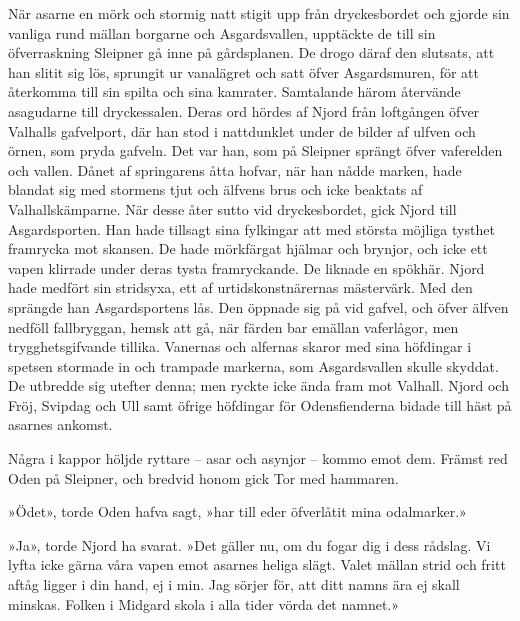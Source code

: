 När asarne en mörk och stormig natt stigit upp från dryckesbordet och
gjorde sin vanliga rund mällan borgarne och Asgardsvallen, upptäckte de
till sin öfverraskning
Sleipner\protect\hypertarget{lb1625905.xhtmlux5cux23start150}{}{}\protect\hypertarget{lb1625905.xhtmlux5cux23start150-a}{}{}\protect\hypertarget{lb1625905.xhtmlux5cux23start150-b}{}{}\protect\hypertarget{lb1625905.xhtmlux5cux23start150-c}{}{}\protect\hypertarget{lb1625905.xhtmlux5cux23start150-d}{}{}
gå inne på gårdsplanen. De drogo däraf den slutsats, att han slitit sig
lös, sprungit ur vanalägret och satt öfver Asgardsmuren, för att
återkomma till sin spilta och sina kamrater. Samtalande härom återvände
asagudarne till dryckessalen. Deras ord hördes af Njord från loftgången
öfver Valhalls gafvelport, där han stod i nattdunklet under de bilder af
ulfven och örnen, som pryda gafveln. Det var han, som på Sleipner
sprängt öfver vaferelden och vallen. Dånet af springarens åtta hofvar,
när han nådde marken, hade blandat sig med stormens tjut och älfvens
brus och icke beaktats af Valhallskämparne. När desse åter sutto vid
dryckesbordet, gick Njord till Asgardsporten. Han hade tillsagt sina
fylkingar att med största möjliga tysthet framrycka mot skansen. De hade
mörkfärgat hjälmar och brynjor, och icke ett vapen klirrade under deras
tysta framryckande. De liknade en spökhär. Njord hade medfört sin
stridsyxa, ett af urtidskonstnärernas mästervärk. Med den sprängde han
Asgardsportens lås. Den öppnade sig på vid gafvel, och öfver älfven
nedföll fallbryggan, hemsk att gå, när färden bar emällan vaferlågor,
men trygghetsgifvande tillika. Vanernas och alfernas skaror med sina
höfdingar i spetsen stormade in och trampade markerna, som Asgardsvallen
skulle skyddat. De utbredde sig utefter denna; men ryckte icke ända fram
mot Valhall. Njord och Fröj, Svipdag och Ull samt öfrige höfdingar för
Odensfienderna bidade till häst på asarnes ankomst.

Några i kappor höljde ryttare -- asar och asynjor -- kommo emot dem.
Främst red Oden på Sleipner, och bredvid honom gick Tor med hammaren.

»Ödet», torde Oden hafva sagt, »har till eder öfverlåtit mina
odalmarker.»

»Ja», torde Njord ha svarat. »Det gäller nu, om du fogar dig i dess
rådslag. Vi lyfta icke gärna våra vapen emot asarnes heliga slägt. Valet
mällan strid och fritt aftåg ligger i din hand, ej i min. Jag sörjer
för, att ditt namns ära ej skall minskas. Folken i Midgard skola i alla
tider vörda det namnet.»

